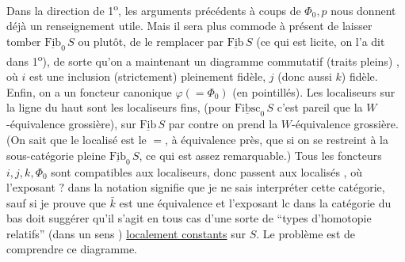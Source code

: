 Dans la direction de 1\textsuperscript{o}, les arguments précédents à coups de $\Phi_0,p$ nous donnent déjà un renseignement utile.
Mais il sera plus commode à présent de laisser tomber $\underline{\mathrm{Fib}}_0\,S$ ou plutôt, de le remplacer par $\underline{\mathrm{Fib}}\,S$ (ce qui est licite, on l'a dit dans 1\textsuperscript{o}), de sorte qu'on a maintenant un diagramme commutatif (traits pleins)
,
où $i$ est une inclusion (strictement) pleinement fidèle, $j$ (donc aussi $k$) fidèle. Enfin, on a un foncteur canonique $\varphi(=\Phi_0)$  (en pointillés). Les localiseurs sur la ligne du haut sont les localiseurs fins, (pour $\underline{\mathrm{Fibsc}}_0\,S$
c'est pareil que la $W$-équivalence grossière), sur $\underline{\mathrm{Fib}}\,S$ par contre on prend la $W$-équivalence grossière. (On sait que le localisé est le $=$, à équivalence près, que si on se restreint à la sous-catégorie pleine $\underline{\mathrm{Fib}}_0\,S$, ce qui est assez remarquable.)
 Tous les  foncteurs $i,j,k,\Phi_0$ sont compatibles aux localiseurs, donc passent aux localisés
,
où l'exposant $?$ dans la notation signifie que je ne sais interpréter cette catégorie, sauf si je prouve que $\bar k$ est une équivalence\unsure{;|,} et l'exposant $\mathrm{lc}$ dans la catégorie du bas
doit suggérer   qu'il s'agit  en tous cas d'une sorte de ``types d'homotopie relatifs'' (dans un sens ) \uline{localement constants} sur $S$. Le problème est de comprendre ce diagramme.

